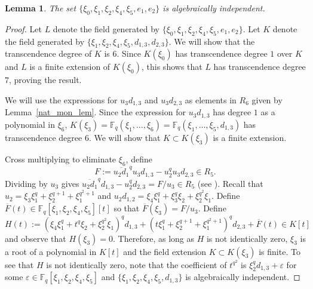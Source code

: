 \documentclass{amsart}
\newtheorem{lemma}[subsection]{Lemma}
\newcommand{\field}{\mathbb{F}}
\begin{document}
\begin{lemma} \label{O7-alg-ind} The set $\{\xi_0,\xi_1,\xi_2,\xi_4,\xi_5,e_1,e_2\}$ is algebraically independent.
\end{lemma} 
\begin{proof} Let $L$ denote the field generated by $\{\xi_0,\xi_1,\xi_2,\xi_4,\xi_5,e_1,e_2\}$.
Let $K$ denote the field generated by $\{\xi_1,\xi_2,\xi_4,\xi_5,d_{1,3},d_{2,3}\}$. 
We will show that the transcendence  degree of $K$ is $6$.
Since $K(\xi_0)$ has transcendence  degree $1$ over $K$ and $L$ is a finite extension of $K(\xi_0)$,
this shows that $L$ has transcendence degree $7$, proving the result.

We will use the expressions for $u_3d_{1,3}$ and $u_3d_{2,3}$ as elements in $R_6$ given by Lemma~\ref{nat_mon_lem}.
Since the expression for $u_3d_{1,3}$ has degree $1$ as a polynomial in $\xi_6$, $K(\xi_3)=\field_q(\xi_1,\ldots,\xi_6)=\field_q(\xi_1,\ldots,\xi_5,d_{1,3})$
has transcendence degree $6$. We will show that $K\subset K(\xi_3)$ is a finite extension.

Cross multiplying to eliminate $\xi_6$, define $$F:=\overline{u_2 d_1}^q u_3 d_{1,3} -u_2^q u_3 d_{2,3}\in R_5.$$
Dividing by $u_3$ gives $\overline{u_2 d_1}^q d_{1,3} -u_2^q d_{2,3}=F/u_3\in R_5$ (see \cite[Lemma 8.3.5]{benson-polyinvafinigrou:93}).
Recall that $u_2=\xi_3\xi_1^q+\xi_2^{q+1}+\xi_1^{q^2+1}$ and $u_2d_{1,2}=\xi_4\xi_1^q+\xi_3^q\xi_2+\xi_2^{q^2}\xi_1$.
Define $\overline{F}(t)\in \field_q[\xi_1,\xi_2,\xi_4,\xi_5][t]$ so that $\overline{F}(\xi_3)=F/u_3$.
Define
$$H(t):=(\xi_4\xi_1^q+t^q\xi_2+\xi_2^{q^2}\xi_1)^qd_{1,3}+(t\xi_1^q+\xi_2^{q+1}+\xi_1^{q^2+1})^qd_{2,3}+\overline{F}(t)\in K[t]$$
and observe that $H(\xi_3)=0$. Therefore, as long as $H$ is not identically zero, $\xi_3$ is a root of a polynomial in $K[t]$ and
the field extension $K\subset K(\xi_3)$ is finite. To see that $H$ is not identically zero, note that the coefficient of $t^{q^2}$
is $\xi_2^q d_{1,3}+\varepsilon$ for some $\varepsilon\in \field_q[\xi_1,\xi_2,\xi_4,\xi_5]$ and
$\{\xi_1,\xi_2,\xi_4,\xi_5,d_{1,3}\}$ is algebraically independent.
\end{proof}
\end{document}
